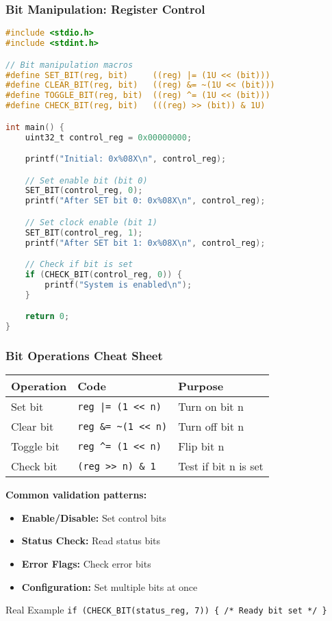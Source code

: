 \documentclass{beamer}
\begin{document}
\begin{frame}[fragile]
\frametitle{Bit Manipulation: Register Control}
\begin{lstlisting}[language=C]
#include <stdio.h>
#include <stdint.h>

// Bit manipulation macros
#define SET_BIT(reg, bit)     ((reg) |= (1U << (bit)))
#define CLEAR_BIT(reg, bit)   ((reg) &= ~(1U << (bit)))
#define TOGGLE_BIT(reg, bit)  ((reg) ^= (1U << (bit)))
#define CHECK_BIT(reg, bit)   (((reg) >> (bit)) & 1U)

int main() {
    uint32_t control_reg = 0x00000000;

    printf("Initial: 0x%08X\n", control_reg);

    // Set enable bit (bit 0)
    SET_BIT(control_reg, 0);
    printf("After SET bit 0: 0x%08X\n", control_reg);

    // Set clock enable (bit 1)
    SET_BIT(control_reg, 1);
    printf("After SET bit 1: 0x%08X\n", control_reg);

    // Check if bit is set
    if (CHECK_BIT(control_reg, 0)) {
        printf("System is enabled\n");
    }

    return 0;
}
\end{lstlisting}
\end{frame}

\begin{frame}
\frametitle{Bit Operations Cheat Sheet}
\begin{center}
\begin{tabular}{|l|l|l|}
\hline
\textbf{Operation} & \textbf{Code} & \textbf{Purpose} \\
\hline
Set bit & \texttt{reg |= (1 << n)} & Turn on bit n \\
Clear bit & \texttt{reg \&= \textasciitilde(1 << n)} & Turn off bit n \\
Toggle bit & \texttt{reg \textasciicircum= (1 << n)} & Flip bit n \\
Check bit & \texttt{(reg >> n) \& 1} & Test if bit n is set \\
\hline
\end{tabular}
\end{center}

\vspace{0.5cm}
\textbf{Common validation patterns:}
\begin{itemize}
    \item \textbf{Enable/Disable:} Set control bits
    \item \textbf{Status Check:} Read status bits
    \item \textbf{Error Flags:} Check error bits
    \item \textbf{Configuration:} Set multiple bits at once
\end{itemize}

\vspace{0.5cm}
\begin{exampleblock}{Real Example}
\texttt{if (CHECK\_BIT(status\_reg, 7)) \{ /* Ready bit set */ \}}
\end{exampleblock}
\end{frame}
\end{document}

